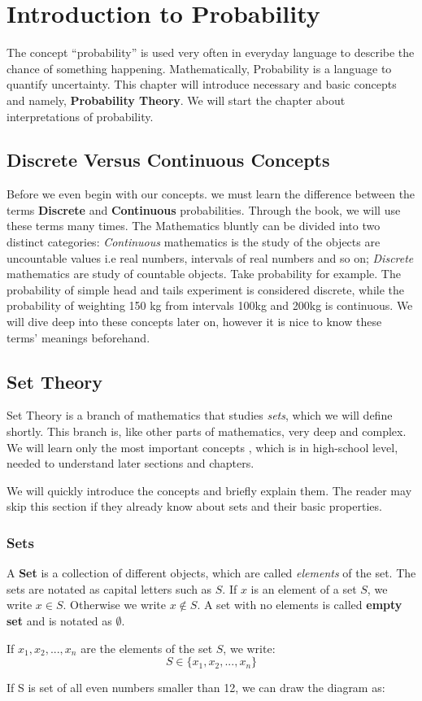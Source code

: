 \chapter{Introduction to Probability}
The concept ``probability'' is used very often in everyday language to describe the chance of something happening. Mathematically, Probability is a language to quantify uncertainty. 
This chapter will introduce necessary and basic concepts and namely, \textbf{Probability Theory}. We will start the chapter about interpretations of probability.

\section*{Discrete Versus Continuous Concepts}
Before we even begin with our concepts. we must learn the difference between the terms \textbf{Discrete} and \textbf{Continuous} probabilities. Through the book, we will use these terms many times.
The Mathematics bluntly can be divided into two distinct categories: \textit{Continuous} mathematics is the study of the objects are uncountable values i.e real numbers, intervals of real numbers and so on; \textit{Discrete} mathematics are study of countable objects.
Take probability for example. The probability of simple head and tails experiment is considered discrete, while the probability of weighting 150 kg from intervals 100kg and 200kg is continuous. We will dive deep into these concepts later on, however it is nice to know these terms' meanings beforehand.

\section{Set Theory}
Set Theory is a branch of mathematics that studies \textit{sets}, which we will define shortly. This branch is, like other parts of mathematics, very deep and complex. We will learn only the most important concepts , which is in high-school level, needed to understand later sections and chapters.
\par
We will quickly introduce the concepts and briefly explain them. The reader may skip this section if they already know about sets and their basic properties.

\subsection*{Sets}
A \textbf{Set} is a collection of different objects, which are called \textit{elements} of the set. The sets are notated as capital letters such as $S$.
If $x$ is an element of a set $S$, we write $x \in S$. Otherwise we write $ x \not\in S$. A set with no elements is called \textbf{empty set} and is notated as $\emptyset$. \par
If $x_1,x_2,...,x_n$ are the elements of the set $S$, we write:
$$ S \in \{x_1,x_2,...,x_n\} $$
\par
If S is set of all even numbers smaller than 12, we can draw the diagram as:



